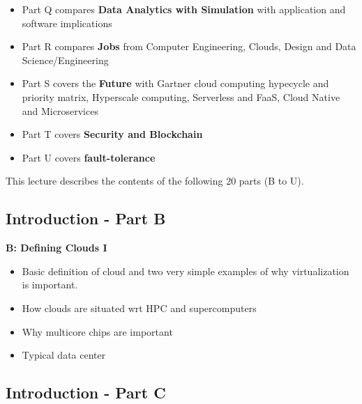 \begin{itemize}
\item Part Q compares \textbf{Data Analytics with Simulation} with
  application and software implications

\item Part R compares \textbf{Jobs} from Computer Engineering, Clouds,
  Design and Data Science/Engineering

\item Part S covers the \textbf{Future} with Gartner cloud computing
  hypecycle and priority matrix, Hyperscale computing, Serverless and
  FaaS, Cloud Native and Microservices

\item Part T covers \textbf{Security and Blockchain}

\item Part U covers \textbf{fault-tolerance}

\end{itemize}


This lecture describes the contents of the following 20 parts (B to U).

\subsection{Introduction - Part B}\label{s:cloud-fundamentals-b}


\textbf{B: Defining Clouds I}
\begin{itemize}
\item Basic definition of cloud and two very simple examples of why
  virtualization is important.
\item How clouds are situated wrt HPC and supercomputers
\item Why multicore chips are important
\item Typical data center
\end{itemize}

\subsection{Introduction - Part C}\label{s:cloud-fundamentals-c}


